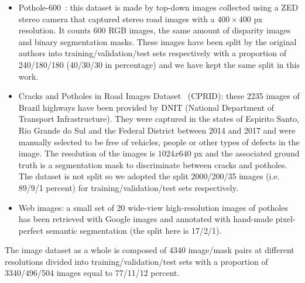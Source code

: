 \documentclass[twocolumn]{article}
\begin{document}
\begin{itemize}
    \item Pothole-600~\cite{Pothole-600_1,Pothole-600_2,Pothole-600_3,Pothole-600_4}: this dataset is made by top-down images collected using a ZED stereo camera that captured stereo road images with a $400\times400$ px resolution. It counts 600 RGB images, the same amount of disparity images and binary segmentation masks. These images have been split by the original authors into training/validation/test sets respectively with a proportion of 240/180/180 (40/30/30 in percentage) and we have kept the same split in this work.
    \item Cracks and Potholes in Road Images Dataset~\cite{CaPiRID} (CPRID): these 2235 images of Brazil highways have been provided by DNIT (National Department of Transport Infrastructure). They were captured in the states of Espirito Santo, Rio Grande do Sul and the Federal District between 2014 and 2017 and were manually selected to be free of vehicles, people or other types of defects in the image. The resolution of the images is $1024x640$ px and the associated ground truth is a segmentation mask to discriminate between cracks and potholes. The dataset is not split so we adopted the split 2000/200/35 images (i.e. 89/9/1 percent) for training/validation/test sets respectively.
    \item Web images: a small set of 20 wide-view high-resolution images of potholes has been retrieved with Google images and annotated with hand-made pixel-perfect semantic segmentation (the split here is 17/2/1).
\end{itemize}

The image dataset as a whole is composed of 4340 image/mask pairs at different resolutions divided into training/validation/test sets with a proportion of 3340/496/504 images equal to 77/11/12 percent.
\end{document}

